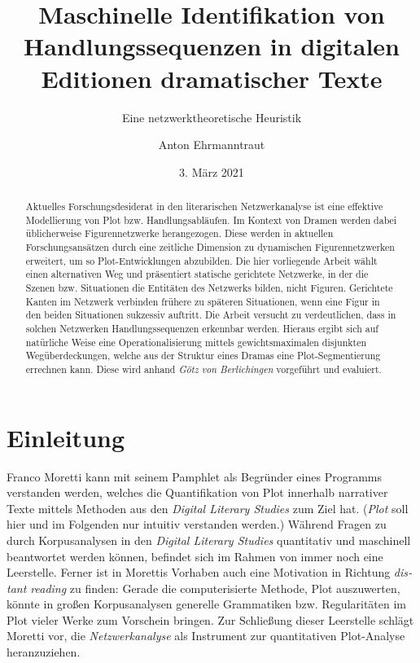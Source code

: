 \documentclass[a4paper,10pt,abstract=true,headings=small]{scrartcl}
\author{Anton Ehrmanntraut}
\date{3. März 2021}
\title{Maschinelle Identifikation von Handlungssequenzen in digitalen Editionen dramatischer Texte}
\subtitle{\vspace*{.5cm}Eine netzwerktheoretische Heuristik\vspace*{.5cm}}
\newcommand{\eng}[1]{\textenglish{\emph{#1}}}
\begin{document}
\flushbottom
\maketitle

\begin{abstract}
    Aktuelles Forschungsdesiderat in den literarischen Netzwerkanalyse ist eine effektive Modellierung von Plot bzw. Handlungsabläufen.
    Im Kontext von Dramen werden dabei üblicherweise Figurennetzwerke herangezogen.
    Diese werden in aktuellen Forschungsansätzen durch eine zeitliche Dimension zu dynamischen Figurennetzwerken erweitert, um so Plot-Entwicklungen abzubilden.
    Die hier vorliegende Arbeit wählt einen alternativen Weg und präsentiert statische gerichtete Netzwerke, in der die Szenen bzw. Situationen die Entitäten des Netzwerks bilden, nicht Figuren.
    Gerichtete Kanten im Netzwerk verbinden frühere zu späteren Situationen, wenn eine Figur in den beiden Situationen sukzessiv auftritt.
    Die Arbeit versucht zu verdeutlichen, dass in solchen Netzwerken Handlungssequenzen erkennbar werden.
    Hieraus ergibt sich auf natürliche Weise eine Operationalisierung mittels gewichtsmaximalen disjunkten Wegüberdeckungen, welche aus der Struktur eines Dramas eine Plot-Segmentierung errechnen kann.
    Diese wird anhand \emph{Götz von Berlichingen} vorgeführt und evaluiert.
\end{abstract}


\section{Einleitung}

Franco Moretti kann mit seinem Pamphlet \autocite{moretti_network_2011} als Begründer eines Programms verstanden werden, welches die Quantifikation von Plot innerhalb narrativer Texte mittels Methoden aus den \eng{Digital Literary Studies} zum Ziel hat.
(\emph{Plot} soll hier und im Folgenden nur intuitiv verstanden werden.)
Während Fragen zu \textquote{\eng{language and style}} durch Korpusanalysen in den \emph{Digital Literary Studies} quantitativ und maschinell beantwortet werden können, befindet sich im Rahmen von \textquote{\eng{plot}} immer noch eine Leerstelle. %
Ferner ist in Morettis Vorhaben auch eine Motivation in Richtung \eng{distant reading} zu finden: Gerade die computerisierte Methode, Plot auszuwerten, könnte in großen Korpusanalysen generelle Grammatiken bzw. Regularitäten im Plot vieler Werke zum Vorschein bringen. %
Zur Schließung dieser Leerstelle schlägt Moretti vor, die \emph{Netzwerkanalyse} als Instrument zur quantitativen Plot-Analyse heranzuziehen.\autocites[Vgl.][]{moretti_network_2011}[Vgl.][]{trilcke_small_2020}
\end{document}
